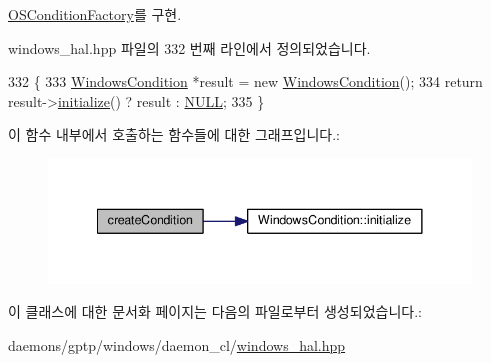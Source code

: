 \hyperlink{class_o_s_condition_factory_ae6df40a45107121057308cf71875f7f4}{O\+S\+Condition\+Factory}를 구현.



windows\+\_\+hal.\+hpp 파일의 332 번째 라인에서 정의되었습니다.


\begin{DoxyCode}
332                                          \{
333         \hyperlink{class_windows_condition}{WindowsCondition} *result = \textcolor{keyword}{new} \hyperlink{class_windows_condition}{WindowsCondition}();
334         \textcolor{keywordflow}{return} result->\hyperlink{class_windows_condition_ab3e7cc706c522b3231f9156bba461436}{initialize}() ? result : \hyperlink{openavb__types__base__pub_8h_a070d2ce7b6bb7e5c05602aa8c308d0c4}{NULL};
335     \}
\end{DoxyCode}


이 함수 내부에서 호출하는 함수들에 대한 그래프입니다.\+:
\nopagebreak
\begin{figure}[H]
\begin{center}
\leavevmode
\includegraphics[width=341pt]{class_windows_condition_factory_a148d6959f334e717f2ec8b948bfe29c5_cgraph}
\end{center}
\end{figure}




이 클래스에 대한 문서화 페이지는 다음의 파일로부터 생성되었습니다.\+:\begin{DoxyCompactItemize}
\item 
daemons/gptp/windows/daemon\+\_\+cl/\hyperlink{windows__hal_8hpp}{windows\+\_\+hal.\+hpp}\end{DoxyCompactItemize}
